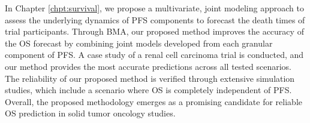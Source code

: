 In Chapter \ref{chpt:survival}, we propose a multivariate, joint modeling approach to assess the underlying dynamics of \ac{PFS} components to forecast the death times of trial participants. Through \ac{BMA}, our proposed method improves the accuracy of the \ac{OS} forecast by combining joint models developed from each granular component of \ac{PFS}. A case study of a renal cell carcinoma trial is conducted, and our method provides the most accurate predictions across all tested scenarios. The reliability of our proposed method is verified through extensive simulation studies, which include a scenario where \ac{OS} is completely independent of \ac{PFS}. Overall, the proposed methodology emerges as a promising candidate for reliable \ac{OS} prediction in solid tumor oncology studies.

